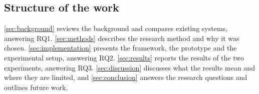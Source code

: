 \subsection{Structure of the work}\label{sec:intro:structure}

\autoref{sec:background} reviews the background and compares existing systems, answering RQ1.
\autoref{sec:methods} describes the research method and why it was chosen.
\autoref{sec:implementation} presents the framework, the prototype and the experimental setup, answering RQ2.
\autoref{sec:results} reports the results of the two experiments, answering RQ3.
\autoref{sec:discussion} discusses what the results mean and where they are limited, and \autoref{sec:conclusion} answers the research questions and outlines future work.
